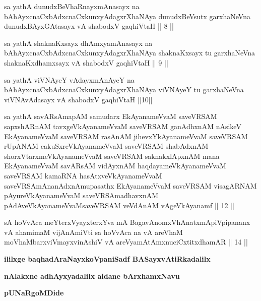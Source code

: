 \begin{kandikeshl}
sa yathA dunudxBeVhaRnayxmAnasayx na bAhAyxcnaCxbAdxcnaCxkunxyAdagxrXhaNAya dunudxBeVsutx garxhaNeVna dunudxBAyxGAtasayx vA shabodxV gaqhiVtaH || 8 ||
\end{kandikeshl}

\begin{kandikeshl}
sa yathA shaknaKxsayx dhAmxyamAnasayx na bAhAyxcnaCxbAdxcnaCxkunxyAdagxrXhaNAya shaknaKxsayx tu garxhaNeVna shaknaKxdhamxsayx vA shabodxV gaqhiVtaH || 9 ||
\end{kandikeshl}

\begin{kandikeshl}
sa yathA viVNAyeY vAdayxmAnAyeY na bAhAyxcnaCxbAdxcnaCxkunxyAdagxrXhaNAya viVNAyeY tu garxhaNeVna viVNAvAdasayx vA shabodxV gaqhiVtaH ||10||
\end{kandikeshl}

\begin{kandikeshl}
sa yathA savARsAmapAM samudarx EkAyanameVvaM saveVRSAM sapxshARnAM tavxgeVkAyanameVvaM saveVRSAM ganAdhxnAM nAsikeV EkAyanameVvaM saveVRSAM rasAnAM jihevxYkAyanameVvaM saveVRSAM rUpANAM cakuSxreVkAyanameVvaM saveVRSAM shabAdxnAM shorxVtarxmeVkAyanameVvaM saveVRSAM saknakxlApxnAM mana EkAyanameVvaM savARsAM vidAyxnAM haqdayameVkAyanameVvaM saveVRSAM kamaRNA hasAtxveVkAyanameVvaM saveVRSAmAnanAdxnAmupasathx EkAyanameVvaM saveVRSAM visagARNAM pAyureVkAyanameVvaM saveVRSAmadhavxnAM pAdAveVkAyanameVvaM\break saveVRSAM veVdAnAM vAgeVkAyanamf || 12 ||
\end{kandikeshl}

\begin{kandikeshl}
sA hoVvAca meYterxVyayxterxYva mA BagavAnomxVhAnatxmApiVpipananx vA ahamimaM vijAnAmiVti sa hoVvAca na vA areV\s haM moVhaM\break barxviVmayxvinAshiV vA areV\s yamAtAmxnuciCxtitxdhamAR || 14 ||
\end{kandikeshl}


\begin{center}
{\bf ililxge baqhadAraNayxkoVpaniSadf BASayxvAtiRkadalilx}
\smallskip

{\bf nAlakxne adhAyxyadalilx aidane bArxhamxNavu}
\smallskip

{\bf pUNaRgoMDide}
\end{center}


